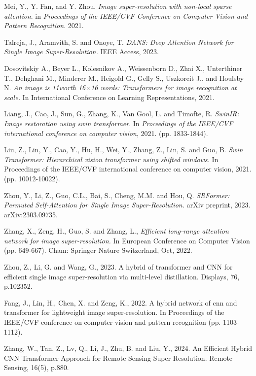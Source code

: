 \documentclass{ieeeaccess}
\begin{document}
\begin{thebibliography}{00}
 Mei, Y., Y. Fan, and Y. Zhou. \textit{Image super-resolution with non-local sparse attention}. in \textit{Proceedings of the IEEE/CVF Conference on Computer Vision and Pattern Recognition}. 2021.

 Talreja, J., Aramvith, S. and Onoye, T. \textit{DANS: Deep Attention Network for Single Image Super-Resolution.} IEEE Access, 2023.

 Dosovitskiy A., Beyer L., Kolesnikov A., Weissenborn D., Zhai X., Unterthiner T., Dehghani M., Minderer M., Heigold G., Gelly S., Uszkoreit J., and Houlsby N. \textit{An image is 11worth 16$\times$16 words: Transformers for image recognition at scale.} In International Conference on Learning Representations, 2021.

 Liang, J., Cao, J., Sun, G., Zhang, K., Van Gool, L. and Timofte, R. \textit{SwinIR: Image restoration using swin transformer}. In \textit{Proceedings of the IEEE/CVF international conference on computer vision}, 2021. (pp. 1833-1844).

 Liu, Z., Lin, Y., Cao, Y., Hu, H., Wei, Y., Zhang, Z., Lin, S. and Guo, B. \textit{Swin Transformer: Hierarchical vision transformer using shifted windows.} In Proceedings of the IEEE/CVF international conference on computer vision, 2021. (pp. 10012-10022).

 Zhou, Y., Li, Z., Guo, C.L., Bai, S., Cheng, M.M. and Hou, Q. \textit{SRFormer: Permuted Self-Attention for Single Image Super-Resolution.} arXiv preprint, 2023. arXiv:2303.09735.

 Zhang, X., Zeng, H., Guo, S. and Zhang, L., \textit{Efficient long-range attention network for image super-resolution.} In European Conference on Computer Vision (pp. 649-667). Cham: Springer Nature Switzerland, Oct, 2022.

 Zhou, Z., Li, G. and Wang, G., 2023. A hybrid of transformer and CNN for efficient single image super-resolution via multi-level distillation. Displays, 76, p.102352.

 Fang, J., Lin, H., Chen, X. and Zeng, K., 2022. A hybrid network of cnn and transformer for lightweight image super-resolution. In Proceedings of the IEEE/CVF conference on computer vision and pattern recognition (pp. 1103-1112).

 Zhang, W., Tan, Z., Lv, Q., Li, J., Zhu, B. and Liu, Y., 2024. An Efficient Hybrid CNN-Transformer Approach for Remote Sensing Super-Resolution. Remote Sensing, 16(5), p.880.


\end{thebibliography}
\end{document}
